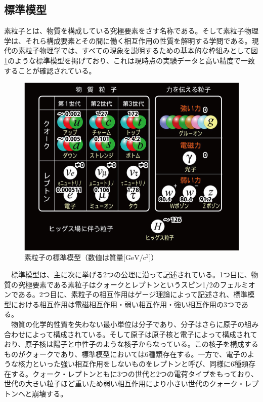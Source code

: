 \subsection{標準模型}
素粒子とは、物質を構成している究極要素をさす名称である。そして素粒子物理学は、それら構成要素とその間に働く相互作用の性質を解明する学問である。現代の素粒子物理学では、すべての現象を説明するための基本的な枠組みとして図\ref{sm}のような標準模型を掲げており、これは現時点の実験データと高い精度で一致することが確認されている。\\
\begin{figure}[ht]
	\begin{center}
 \includegraphics[keepaspectratio, scale=0.4]
 	{Figure/Introduction/sm.jpg}
 		\caption{素粒子の標準模型（数値は質量[$\mathrm{GeV/c^2}$]）}
 		\label{sm}
	\end{center}
\end{figure}
　標準模型は、主に次に挙げる2つの公理に沿って記述されている。1つ目に、物質の究極要素である素粒子はクォークとレプトンというスピン1/2のフェルミオンである。2つ目に、素粒子の相互作用はゲージ理論によって記述され、標準模型における相互作用は電磁相互作用・弱い相互作用・強い相互作用の3つである。\\
　物質の化学的性質を失わない最小単位は分子であり、分子はさらに原子の組み合わせによって構成されている。そして原子は原子核と電子によって構成されており、原子核は陽子と中性子のような核子からなっている。この核子を構成するものがクォークであり、標準模型においては6種類存在する。一方で、電子のような核力といった強い相互作用をしないものをレプトンと呼び、同様に6種類存在する。クォーク・レプトンともに3つの世代と2つの電荷タイプをもっており、世代の大きい粒子ほど重いため弱い相互作用により小さい世代のクォーク・レプトンへと崩壊する。\\
